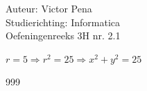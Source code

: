 \documentclass[a4paper]{article}
\begin{document}
	
	\noindent \large Auteur: Victor Pena \\
	\noindent \large Studierichting: Informatica\\
	\noindent \large Oefeningenreeks 3H nr. 2.1\\
	
	\medskip
	
	\normalsize 
	
	$r=5 \Rightarrow r^2 = 25 \Rightarrow x^2+y^2=25$
	
	
	\begin{thebibliography}{999}
	\end{thebibliography}
\end{document}
